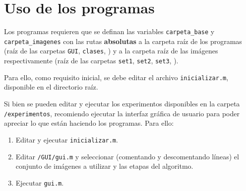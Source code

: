\chapter{Uso de los programas}\label{anexo2}

Los programas requieren que se definan las variables \texttt{carpeta\_base} y \texttt{carpeta\_imagenes} con las rutas \textbf{absolutas} a la carpeta raíz de los programas (raíz de las carpetas \texttt{GUI}, \texttt{clases}, \textellipsis) y a la carpeta raíz de las imágenes respectivamente (raíz de las carpetas \texttt{set1}, \texttt{set2}, \texttt{set3}, \textellipsis).


Para ello, como requisito inicial, se debe editar el archivo \texttt{inicializar.m}, disponible en el directorio raíz.

Si bien se pueden editar y ejecutar los experimentos disponibles en la carpeta \texttt{/experimentos}, recomiendo ejecutar la interfaz gráfica de usuario para poder apreciar lo que están haciendo los programas. Para ello:

\begin{enumerate}
\item Editar y ejecutar \texttt{inicializar.m}.
\item Editar \texttt{/GUI/gui.m} y seleccionar (comentando y descomentando líneas) el conjunto de imágenes a utilizar y las etapas del algoritmo.
\item Ejecutar \texttt{gui.m}.
\end{enumerate}
